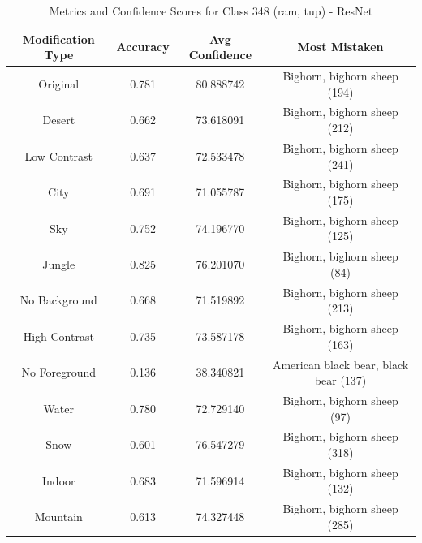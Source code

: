 \begin{table}
	\centering
	\begin{tabular}{|c|c|c|c|}
		\hline
		\textbf{Modification Type} & \textbf{Accuracy} & \textbf{Avg Confidence} & \textbf{Most Mistaken} \\
		\hline
		Original & 0.781 & 80.888742 & Bighorn, bighorn sheep (194) \\
		\hline
		Desert & 0.662 & 73.618091 & Bighorn, bighorn sheep (212) \\
		\hline
		Low Contrast & 0.637 & 72.533478 & Bighorn, bighorn sheep (241) \\
		\hline
		City & 0.691 & 71.055787 & Bighorn, bighorn sheep (175) \\
		\hline
		Sky & 0.752 & 74.196770 & Bighorn, bighorn sheep (125) \\
		\hline
		Jungle & 0.825 & 76.201070 & Bighorn, bighorn sheep (84) \\
		\hline
		No Background & 0.668 & 71.519892 & Bighorn, bighorn sheep (213) \\
		\hline
		High Contrast & 0.735 & 73.587178 & Bighorn, bighorn sheep (163) \\
		\hline
		No Foreground & 0.136 & 38.340821 & American black bear, black bear (137) \\
		\hline
		Water & 0.780 & 72.729140 & Bighorn, bighorn sheep (97) \\
		\hline
		Snow & 0.601 & 76.547279 & Bighorn, bighorn sheep (318) \\
		\hline
		Indoor & 0.683 & 71.596914 & Bighorn, bighorn sheep (132) \\
		\hline
		Mountain & 0.613 & 74.327448 & Bighorn, bighorn sheep (285) \\
		\hline
	\end{tabular}
	\caption{Metrics and Confidence Scores for Class 348 (ram, tup) - ResNet}
	\label{tab:metrics_confidence_class_348_resnet}
\end{table}

